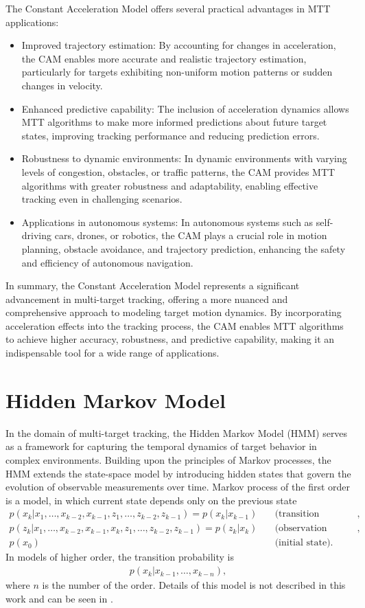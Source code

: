 The Constant Acceleration Model offers several practical advantages in MTT applications:
\begin{itemize}
    \item Improved trajectory estimation: By accounting for changes in acceleration, the CAM enables more accurate
    and realistic trajectory estimation, particularly for targets exhibiting non-uniform motion patterns or sudden changes in velocity.
    \item Enhanced predictive capability: The inclusion of acceleration dynamics allows MTT algorithms to make more
    informed predictions about future target states, improving tracking performance and reducing prediction errors.
    \item Robustness to dynamic environments: In dynamic environments with varying levels of congestion, obstacles,
    or traffic patterns, the CAM provides MTT algorithms with greater robustness and adaptability, enabling effective tracking even in challenging scenarios.
    \item Applications in autonomous systems: In autonomous systems such as self-driving cars, drones, or robotics,
    the CAM plays a crucial role in motion planning, obstacle avoidance, and trajectory prediction, enhancing the safety and efficiency of autonomous navigation.
\end{itemize}
In summary, the Constant Acceleration Model represents a significant advancement in multi-target tracking, offering a
more nuanced and comprehensive approach to modeling target motion dynamics. By incorporating acceleration effects
into the tracking process, the CAM enables MTT algorithms to achieve higher accuracy, robustness, and predictive capability, making it an indispensable tool for a wide range of applications.

    \section{Hidden Markov Model}
In the domain of multi-target tracking, the Hidden Markov Model (HMM) serves as a framework for
capturing the temporal dynamics of target behavior in complex environments. Building upon the principles of Markov
processes, the HMM extends the state-space model by introducing hidden states that govern the evolution of observable
measurements over time. Markov process of the first order is a model, in which current state depends only on the
previous state
\begin{align}
    p(x_k|x_1,\dots,x_{k-2},x_{k-1}, z_1, \dots, z_{k-2}, z_{k-1}) = p(x_k|x_{k-1}) &\quad \text{(transition
    probability)}, \\
    p(z_k|x_1,\dots,x_{k-2},x_{k-1}, x_k, z_1, \dots, z_{k-2}, z_{k-1}) = p(z_k|x_{k}) &\quad \text{(observation
    likelihood)}, \\
    p(x_0)& \quad \text{(initial state)}.
\end{align}
In models of higher order, the transition probability is
\begin{align}
    p(x_k|x_{k-1},\dots,x_{k-n}),
\end{align}
where $n$ is the number of the order. Details of this model is not described in this work and can be seen in \cite{
    HadarHMMHigherOrder}.


